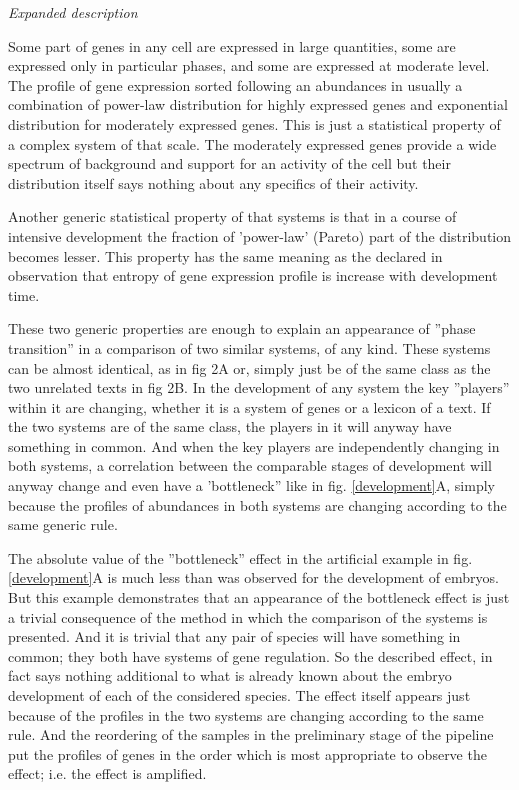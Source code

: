 \documentclass[12pt,aps]{revtex4}
\begin{document}
\emph{Expanded description}

Some part of genes in any cell are expressed in large quantities, some are expressed only in particular phases, and some are expressed at moderate level. The profile of gene expression sorted following an abundances in usually a combination of power-law distribution for highly expressed genes and exponential distribution for moderately expressed genes. This is just a statistical property of a complex system of that scale. The moderately expressed genes provide a wide spectrum of background and support for an activity of the cell but their distribution itself says nothing about any specifics of their activity. 

Another generic statistical property of that systems is that in a course of intensive development the fraction of 'power-law' (Pareto) part of the distribution becomes lesser. This property has the same meaning as the declared in \cite{CR1} observation that entropy of gene expression profile is increase with development time. 

These two generic properties are enough to explain an appearance of ''phase transition'' in a comparison of two similar systems, of any kind. These systems can be almost identical, as in fig 2A or, simply just be of the same class as the two unrelated texts in fig 2B. In the development of any system the key ''players'' within it are changing, whether it is a system of genes or a lexicon of a text. If the two systems are of the same class, the players in it will anyway have something in common. And when the key players are independently changing in both systems, a correlation between the comparable stages of development will anyway change and even have a 'bottleneck'' like in fig. \ref{development}A, simply because the profiles of abundances in both systems are changing according to the same generic rule.

The absolute value of the ''bottleneck'' effect in the artificial example in fig. \ref{development}A is much less than was observed for the development of embryos. But this example demonstrates that an appearance of the bottleneck effect is just a trivial consequence of the method in which the comparison of the systems is presented. And it is trivial that any pair of species will have something in common; they both have systems of gene regulation. So the described effect, in fact says nothing additional to what is already known about the embryo development of each of the considered species. The effect itself appears just because of the profiles in the two systems are changing according to the same rule. And the reordering of the samples in the preliminary stage of the pipeline put the profiles of genes in the order which is most appropriate to observe the effect; i.e. the effect is amplified.
\end{document}
